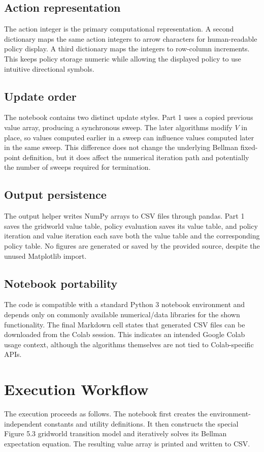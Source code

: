 \documentclass[11pt,a4paper]{article}
\begin{document}
\subsection{Action representation}
The action integer is the primary computational representation. A second dictionary maps the same action integers to arrow characters for human-readable policy display. A third dictionary maps the integers to row-column increments. This keeps policy storage numeric while allowing the displayed policy to use intuitive directional symbols.

\subsection{Update order}
The notebook contains two distinct update styles. Part 1 uses a copied previous value array, producing a synchronous sweep. The later algorithms modify \(V\) in place, so values computed earlier in a sweep can influence values computed later in the same sweep. This difference does not change the underlying Bellman fixed-point definition, but it does affect the numerical iteration path and potentially the number of sweeps required for termination.

\subsection{Output persistence}
The output helper writes NumPy arrays to CSV files through pandas. Part 1 saves the gridworld value table, policy evaluation saves its value table, and policy iteration and value iteration each save both the value table and the corresponding policy table. No figures are generated or saved by the provided source, despite the unused Matplotlib import.

\subsection{Notebook portability}
The code is compatible with a standard Python 3 notebook environment and depends only on commonly available numerical/data libraries for the shown functionality. The final Markdown cell states that generated CSV files can be downloaded from the Colab session. This indicates an intended Google Colab usage context, although the algorithms themselves are not tied to Colab-specific APIs.

\section{Execution Workflow}
The execution proceeds as follows. The notebook first creates the environment-independent constants and utility definitions. It then constructs the special Figure 5.3 gridworld transition model and iteratively solves its Bellman expectation equation. The resulting value array is printed and written to CSV.
\end{document}
